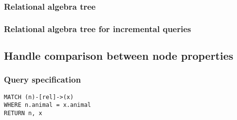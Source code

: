 \subsubsection*{Relational algebra tree}


\subsubsection*{Relational algebra tree for incremental queries}


\subsection{Handle comparison between node properties}

\subsubsection*{Query specification}

\begin{lstlisting}
MATCH (n)-[rel]->(x)
WHERE n.animal = x.animal
RETURN n, x
\end{lstlisting}

